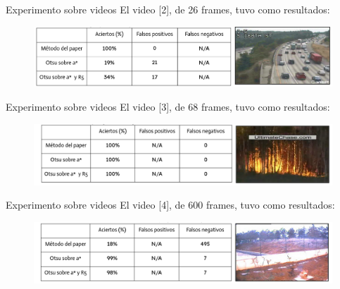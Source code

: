\documentclass{beamer}
\begin{document}
\begin{frame}{Experimento sobre videos}
    El video [2], de 26 frames, tuvo como resultados:
    \begin{figure}
        \centering
        \includegraphics[width=1\linewidth]{figures/exp_video_2.png}
    \end{figure}
\end{frame}

\begin{frame}{Experimento sobre videos}
    El video [3], de 68 frames, tuvo como resultados:
    \begin{figure}
        \centering
        \includegraphics[width=1\linewidth]{figures/exp_video_3.png}
        \label{fig:exp_video_3}
    \end{figure}
\end{frame}

\begin{frame}{Experimento sobre videos}
    El video [4], de 600 frames, tuvo como resultados:

    \begin{figure}
        \centering
        \includegraphics[width=1\linewidth]{figures/exp_video_4.png}
        \label{fig:exp_video_4}
    \end{figure}
\end{frame}
\end{document}
